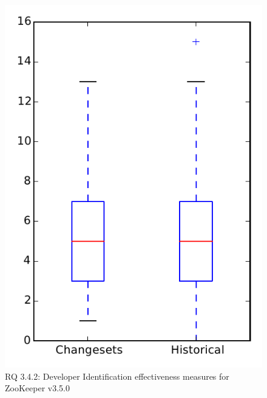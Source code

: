
\begin{figure}
\centering
\includegraphics[height=0.4\textheight]{figures/dit/rq2_zookeeper}
\caption{RQ 3.4.2: Developer Identification effectiveness measures for ZooKeeper v3.5.0}
\label{fig:dit:rq2:zookeeper}
\end{figure}
